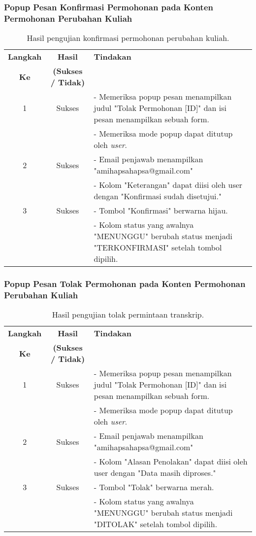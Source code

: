 \subsubsection{Popup Pesan Konfirmasi Permohonan pada Konten Permohonan Perubahan Kuliah}
\begin{table}[H]
	\centering 
	\caption{Hasil pengujian konfirmasi permohonan perubahan kuliah.}
	\label{hasil:KonfirmasiPerubahanKuliah}
	\begin{tabular}{|c| c| p{}|}
		\toprule
		\textbf{Langkah} & \textbf{Hasil} & \textbf{Tindakan}\\
		\textbf{Ke} & \textbf{(Sukses / Tidak)} &\\
		\midrule
		1&Sukses& - Memeriksa popup pesan menampilkan judul "Tolak Permohonan [ID]" dan isi pesan menampilkan sebuah form.\\
		&& - Memeriksa mode popup dapat ditutup oleh \textit{user}.\\
		\hline
		2&Sukses& - Email penjawab menampilkan "amihapsahapsa@gmail.com"\\
		&& - Kolom "Keterangan" dapat diisi oleh user dengan "Konfirmasi sudah disetujui."\\
		\hline
		3&Sukses&- Tombol "Konfirmasi" berwarna hijau.\\
		&& - Kolom status yang awalnya "MENUNGGU" berubah status menjadi "TERKONFIRMASI" setelah tombol dipilih.\\		
		\bottomrule		
	\end{tabular} 
\end{table}

\subsubsection{Popup Pesan Tolak Permohonan pada Konten Permohonan Perubahan Kuliah}
\begin{table}[H]
	\centering 
	\caption{Hasil pengujian tolak permintaan transkrip.}
	\label{hasil:TolakPerubahanKuliah}
	\begin{tabular}{|c| c| p{}|}
		\toprule
		\textbf{Langkah} & \textbf{Hasil} & \textbf{Tindakan}\\
		\textbf{Ke} & \textbf{(Sukses / Tidak)} &\\
		\midrule
		1&Sukses& - Memeriksa popup pesan menampilkan judul "Tolak Permohonan [ID]" dan isi pesan menampilkan sebuah form.\\
		&& - Memeriksa mode popup dapat ditutup oleh \textit{user}.\\
		\hline
		2&Sukses& - Email penjawab menampilkan "amihapsahapsa@gmail.com"\\
		&& - Kolom "Alasan Penolakan" dapat diisi oleh user dengan "Data masih diproses."\\
		\hline
		3&Sukses&- Tombol "Tolak" berwarna merah.\\
		&& - Kolom status yang awalnya "MENUNGGU" berubah status menjadi "DITOLAK" setelah tombol dipilih.\\		
		\bottomrule		
	\end{tabular} 
\end{table}

